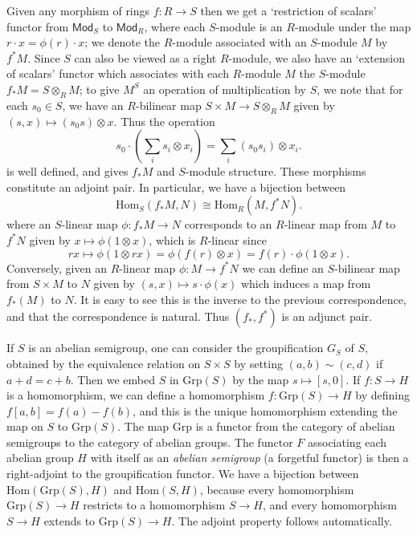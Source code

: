 \begin{example}
    Given any morphism of rings $f: R \to S$ then we get a `restriction of scalars' functor from $\mathsf{Mod}_S$ to $\mathsf{Mod}_R$, where each $S$-module is an $R$-module under the map $r \cdot x = \phi(r) \cdot x$; we denote the $R$-module associated with an $S$-module $M$ by $f^*M$. Since $S$ can also be viewed as a right $R$-module, we also have an `extension of scalars' functor which associates with each $R$-module $M$ the $S$-module $f_* M = S \otimes_R M$; to give $M^S$ an operation of multiplication by $S$, we note that for each $s_0 \in S$, we have an $R$-bilinear map $S \times M \to S \otimes_R M$ given by $(s,x) \mapsto (s_0s) \otimes x$. Thus the operation
    \[ s_0 \cdot \left( \sum_i s_i \otimes x_i \right) = \sum_i (s_0 s_i) \otimes x_i. \]
    is well defined, and gives $f_* M$ and $S$-module structure. These morphisms constitute an adjoint pair. In particular, we have a bijection between
    \[ \text{Hom}_S(f_* M,N) \cong \text{Hom}_R(M,f^*N). \]
    where an $S$-linear map $\phi: f_* M \to N$ corresponds to an $R$-linear map from $M$ to $f^*N$ given by $x \mapsto \phi(1 \otimes x)$, which is $R$-linear since
    \[ rx \mapsto \phi(1 \otimes rx) = \phi(f(r) \otimes x) = f(r) \cdot \phi(1 \otimes x). \]
    Conversely, given an $R$-linear map $\phi: M \to f^* N$ we can define an $S$-bilinear map from $S \times M$ to $N$ given by $(s,x) \mapsto s \cdot \phi(x)$ which induces a map from $f_*(M)$ to $N$. It is easy to see this is the inverse to the previous correspondence, and that the correspondence is natural. Thus $(f_*, f^*)$ is an adjunct pair.
\end{example}

\begin{example}
    If $S$ is an abelian semigroup, one can consider the groupification $G_S$ of $S$, obtained by the equivalence relation on $S \times S$ by setting $(a,b) \sim (c,d)$ if $a + d = c + b$. Then we embed $S$ in $\text{Grp}(S)$ by the map $s \mapsto [s,0]$. If $f: S \to H$ is a homomorphism, we can define a homomorphism $f: \text{Grp}(S) \to H$ by defining $f[a,b] = f(a) - f(b)$, and this is the unique homomorphism extending the map on $S$ to $\text{Grp}(S)$. The map $\text{Grp}$ is a functor from the category of abelian semigroups to the category of abelian groups. The functor $F$ associating each abelian group $H$ with itself as an {\it abelian semigroup} (a forgetful functor) is then a right-adjoint to the groupification functor. We have a bijection between $\text{Hom}(\text{Grp}(S),H)$ and $\text{Hom}(S,H)$, because every homomorphism $\text{Grp}(S) \to H$ restricts to a homomorphism $S \to H$, and every homomorphism $S \to H$ extends to $\text{Grp}(S) \to H$. The adjoint property follows automatically.
\end{example}

